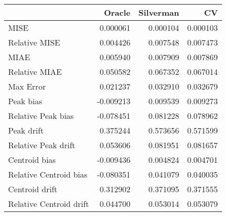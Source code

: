 \begin{tabular}{lrrr}
  \hline
 & Oracle & Silverman & CV \\ 
  \hline
MISE & 0.000061 & 0.000104 & 0.000103 \\ 
  Relative MISE & 0.004426 & 0.007548 & 0.007473 \\ 
  MIAE & 0.005940 & 0.007909 & 0.007869 \\ 
  Relative MIAE & 0.050582 & 0.067352 & 0.067014 \\ 
  Max Error & 0.021237 & 0.032910 & 0.032679 \\ 
  Peak bias & -0.009213 & 0.009539 & 0.009273 \\ 
  Relative Peak bias & -0.078451 & 0.081228 & 0.078962 \\ 
  Peak drift & 0.375244 & 0.573656 & 0.571599 \\ 
  Relative Peak drift & 0.053606 & 0.081951 & 0.081657 \\ 
  Centroid bias & -0.009436 & 0.004824 & 0.004701 \\ 
  Relative Centroid bias & -0.080351 & 0.041079 & 0.040035 \\ 
  Centroid drift & 0.312902 & 0.371095 & 0.371555 \\ 
  Relative Centroid drift & 0.044700 & 0.053014 & 0.053079 \\ 
   \hline
\end{tabular}
